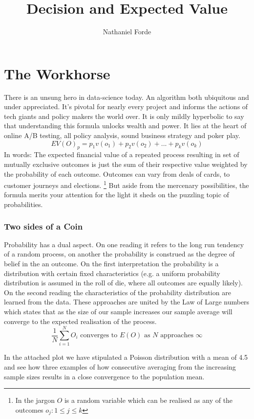 \documentclass[10pt,a4paper,notitlepage,twocolumn]{article}
\author{Nathaniel Forde}
\title{Decision and Expected Value}
\begin{document}
\section*{The Workhorse}

There is an unsung hero in data-science today. An algorithm  both ubiquitous and under appreciated. It's pivotal for nearly every project and informs the actions of tech giants and policy makers the world over. It is only mildly hyperbolic to say that understanding this formula unlocks wealth and power. It lies at the heart of online A/B testing, all policy analysis, sound business strategy and poker play.
$$ EV(O)_{p} = p_{1}v(o_{1}) + p_{2}v(o_{2}) + ... + p_{k}v(o_{k}) $$
In words: The expected financial value of a repeated process resulting in set of mutually exclusive outcomes is just the sum of their respective value weighted by the probability of each outcome. Outcomes can vary from deals of cards, to customer journeys and elections. \footnote{In the jargon $O$ is a random variable which can be realised as any of the outcomes  $ o_{j} :  1 \leq j \leq k$} 
But aside from the mercenary possibilities, the formula merits your attention for the light it sheds on the puzzling topic of probabilities. 

\subsubsection*{Two sides of a Coin}
Probability has a dual aspect. On one reading it refers to the long run tendency of a random process, on another the probability is construed as the degree of belief in the an outcome. On the first interpretation the probability is a distribution with certain fixed characteristics (e.g. a uniform probability distribution is assumed in the roll of die, where all outcomes are equally likely). On the second reading the characteristics of the probability distribution are learned from the data. These approaches are united by the Law of Large numbers which states that as the size of our sample increases our sample average will converge to the expected realisation of the process.
$$  \frac{1}{N} \sum_{i = 1}^{N} O_{i} \text{ converges to }  E(O) \text{ as } N \text{ approaches } \infty $$

 In the attached plot we have stipulated a Poisson distribution with a mean of 4.5 and see how three examples of how consecutive averaging from the increasing sample sizes results in a close convergence to the population mean.\newline
\end{document}
